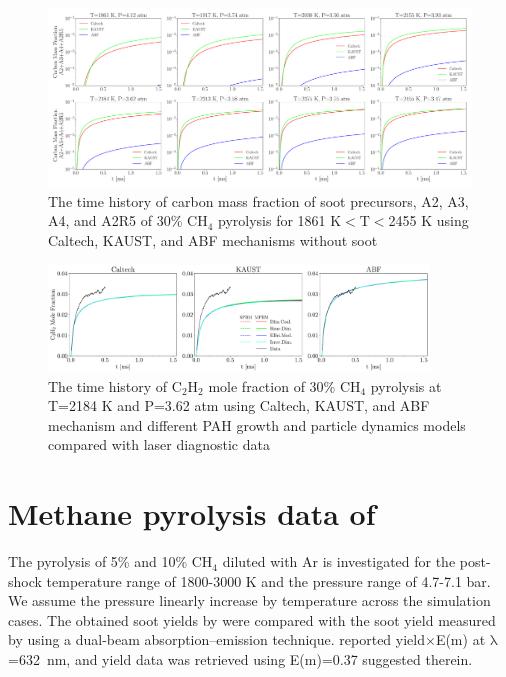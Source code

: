 \begin{figure}[H]
	\centering
	\includegraphics[width=1\textwidth]{Figures/Results/Shocktube/Stanford/june/30CH4_SPC_mechs_nosoot.pdf}
	\caption{The time history of carbon mass fraction of soot precursors, A2, A3, A4, and A2R5 of 30\% $\mathrm{CH_4}$ pyrolysis for 1861 K$<\mathrm{T}<$2455 K using Caltech, KAUST, and ABF mechanisms without soot}
	\label{fig:shocktubest_30ch4_nosoot_spc} 
\end{figure}


\begin{figure}[H]
	\centering
	\includegraphics[width=0.9\textwidth]{Figures/Results/Shocktube/Stanford/june/stsh_mech_compare_C2H2.pdf}
	\caption{The time history of $\mathrm{C_2H_2}$ mole fraction of 30\% $\mathrm{CH_4}$ pyrolysis at T=2184 K and P=3.62 atm using Caltech, KAUST, and ABF mechanism and different PAH growth and particle dynamics models  compared with laser diagnostic data}
	\label{fig:shocktubestc2h2} 
\end{figure}

\section{Methane pyrolysis data of \citet{agafonov2016unified}}

The pyrolysis of 5\% and 10\% $\mathrm{CH_4}$ diluted with Ar is investigated for the post-shock temperature range of 1800-3000 K and the pressure range of 4.7-7.1 bar. We assume the pressure linearly increase by temperature across the simulation cases. The obtained soot yields by were compared with the soot yield measured by \citet{agafonov2016unified} using a dual-beam absorption–emission technique. \citet{agafonov2016unified} reported yield$\times$E(m) at $\mathrm{\lambda}$=632~nm, and yield data was retrieved using E(m)=0.37 suggested therein. 




